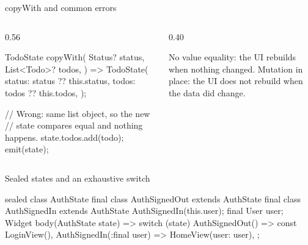 \documentclass[10pt,aspectratio=169,t]{beamer}
\begin{document}
\begin{frame}[fragile,eyebrow=State]{copyWith and common errors}
  \begin{columns}[T]
    \begin{column}{0.56\textwidth}
\begin{dart}
TodoState copyWith({
  Status? status,
  List<Todo>? todos,
}) => TodoState(
      status: status ?? this.status,
      todos: todos ?? this.todos,
    );

// Wrong: same list object, so the new
// state compares equal and nothing happens.
state.todos.add(todo);
emit(state);
\end{dart}
    \end{column}
    \begin{column}{0.40\textwidth}
      \begin{warning}
        No value equality: the UI rebuilds when nothing changed. Mutation in place: the UI does not rebuild when the data did change.
      \end{warning}
    \end{column}
  \end{columns}
\end{frame}

\begin{frame}[fragile,eyebrow=State]{Sealed states and an exhaustive switch}
\begin{dart}
sealed class AuthState {}
final class AuthSignedOut extends AuthState {}
final class AuthSignedIn extends AuthState {
  AuthSignedIn(this.user);
  final User user;
}
Widget body(AuthState state) => switch (state) {
      AuthSignedOut() => const LoginView(),
      AuthSignedIn(:final user) => HomeView(user: user),
    };
\end{dart}
  \vskip 1mm
\end{frame}
\end{document}
